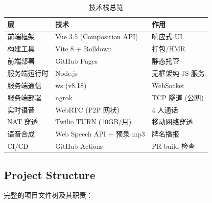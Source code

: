 \documentclass[11pt,a4paper]{article}
\begin{document}
\begin{table}[H]
\centering
\caption{技术栈总览}
\label{tab:stack}
\small
\begin{tabular}{@{}lll@{}}
\toprule
\textbf{层} & \textbf{技术} & \textbf{作用} \\
\midrule
前端框架 & Vue 3.5 (Composition API) & 响应式 UI \\
构建工具 & Vite 8 + Rolldown & 打包/HMR \\
前端部署 & GitHub Pages & 静态托管 \\
服务端运行时 & Node.js & 无框架纯 JS 服务 \\
服务端通信 & ws (v8.18) & WebSocket \\
服务端部署 & ngrok & TCP 隧道 (公网) \\
实时语音 & WebRTC (P2P 网状) & 4 人通话 \\
NAT 穿透 & Twilio TURN (10GB/月) & 移动网络穿透 \\
语音合成 & Web Speech API + 预录 mp3 & 牌名播报 \\
CI/CD & GitHub Actions & PR build 检查 \\
\bottomrule
\end{tabular}
\end{table}

\subsection{Project Structure}

完整的项目文件树及其职责：
\end{document}
